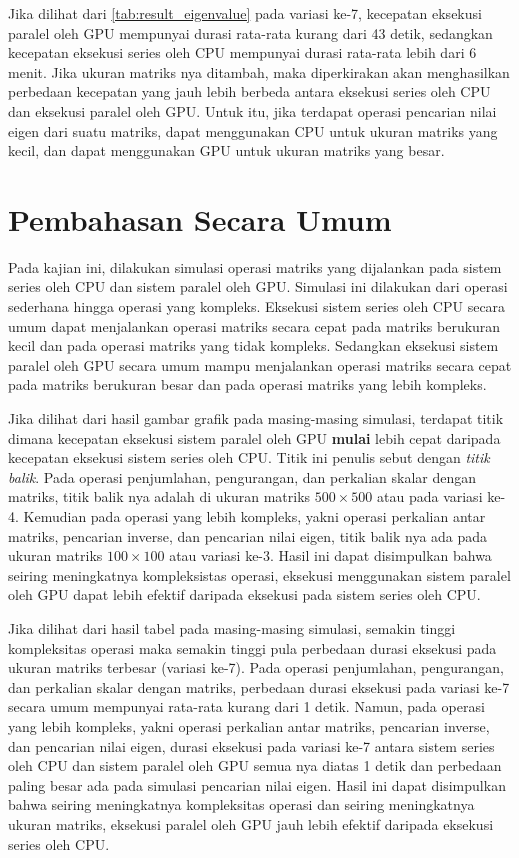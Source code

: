 Jika dilihat dari \ref{tab:result_eigenvalue} pada variasi ke-7, kecepatan eksekusi paralel oleh GPU mempunyai durasi rata-rata kurang dari 43 detik, sedangkan kecepatan eksekusi series oleh CPU mempunyai durasi rata-rata lebih dari 6 menit. Jika ukuran matriks nya ditambah, maka diperkirakan akan menghasilkan perbedaan kecepatan yang jauh lebih berbeda antara eksekusi series oleh CPU dan eksekusi paralel oleh GPU. Untuk itu, jika terdapat operasi pencarian nilai eigen dari suatu matriks, dapat menggunakan CPU untuk ukuran matriks yang kecil, dan dapat menggunakan GPU untuk ukuran matriks yang besar.

\section{Pembahasan Secara Umum}

Pada kajian ini, dilakukan simulasi operasi matriks yang dijalankan pada sistem series oleh CPU dan sistem paralel oleh GPU. Simulasi ini dilakukan dari operasi sederhana hingga operasi yang kompleks. Eksekusi sistem series oleh CPU secara umum dapat menjalankan operasi matriks secara cepat pada matriks berukuran kecil dan pada operasi matriks yang tidak kompleks. Sedangkan eksekusi sistem paralel oleh GPU secara umum mampu menjalankan operasi matriks secara cepat pada matriks berukuran besar dan pada operasi matriks yang lebih kompleks.

Jika dilihat dari hasil gambar grafik pada masing-masing simulasi, terdapat titik dimana kecepatan eksekusi sistem paralel oleh GPU \textbf{mulai} lebih cepat daripada kecepatan eksekusi sistem series oleh CPU. Titik ini penulis sebut dengan \emph{titik balik}. Pada operasi penjumlahan, pengurangan, dan perkalian skalar dengan matriks, titik balik nya adalah di ukuran matriks $500 \times 500$ atau pada variasi ke-4. Kemudian pada operasi yang lebih kompleks, yakni operasi perkalian antar matriks, pencarian inverse, dan pencarian nilai eigen, titik balik nya ada pada ukuran matriks $100 \times 100$ atau variasi ke-3. Hasil ini dapat disimpulkan bahwa seiring meningkatnya kompleksistas operasi, eksekusi menggunakan sistem paralel oleh GPU dapat lebih efektif daripada eksekusi pada sistem series oleh CPU.

Jika dilihat dari hasil tabel pada masing-masing simulasi, semakin tinggi kompleksitas operasi maka semakin tinggi pula perbedaan durasi eksekusi pada ukuran matriks terbesar (variasi ke-7). Pada operasi penjumlahan, pengurangan, dan perkalian skalar dengan matriks, perbedaan durasi eksekusi pada variasi ke-7 secara umum mempunyai rata-rata kurang dari 1 detik. Namun, pada operasi yang lebih kompleks, yakni operasi perkalian antar matriks, pencarian inverse, dan pencarian nilai eigen, durasi eksekusi pada variasi ke-7 antara sistem series oleh CPU dan sistem paralel oleh GPU semua nya diatas 1 detik dan perbedaan paling besar ada pada simulasi pencarian nilai eigen. Hasil ini dapat disimpulkan bahwa seiring meningkatnya kompleksitas operasi dan seiring meningkatnya ukuran matriks, eksekusi paralel oleh GPU jauh lebih efektif daripada eksekusi series oleh CPU.


